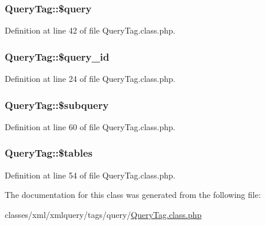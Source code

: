 \subsubsection[{\$query}]{\setlength{\rightskip}{0pt plus 5cm}Query\+Tag\+::\$query}\label{classQueryTag_a40fbf27ebaa31f5430080152164c3bae}


Definition at line 42 of file Query\+Tag.\+class.\+php.

\hypertarget{classQueryTag_ac9ddaab237f51a26128e5f4d2869a430}{}
\subsubsection[{\$query\+\_\+id}]{\setlength{\rightskip}{0pt plus 5cm}Query\+Tag\+::\$query\+\_\+id}\label{classQueryTag_ac9ddaab237f51a26128e5f4d2869a430}


Definition at line 24 of file Query\+Tag.\+class.\+php.

\hypertarget{classQueryTag_a1fb40050f2484c2daa9e77cf53d11c15}{}
\subsubsection[{\$subquery}]{\setlength{\rightskip}{0pt plus 5cm}Query\+Tag\+::\$subquery}\label{classQueryTag_a1fb40050f2484c2daa9e77cf53d11c15}


Definition at line 60 of file Query\+Tag.\+class.\+php.

\hypertarget{classQueryTag_aed79c0c40d39fe9042ade3b23b6e172e}{}
\subsubsection[{\$tables}]{\setlength{\rightskip}{0pt plus 5cm}Query\+Tag\+::\$tables}\label{classQueryTag_aed79c0c40d39fe9042ade3b23b6e172e}


Definition at line 54 of file Query\+Tag.\+class.\+php.



The documentation for this class was generated from the following file\+:\begin{DoxyCompactItemize}
\item 
classes/xml/xmlquery/tags/query/\hyperlink{QueryTag_8class_8php}{Query\+Tag.\+class.\+php}\end{DoxyCompactItemize}
